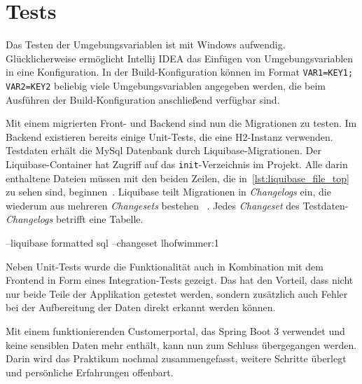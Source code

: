 \section{Tests}

Das Testen der Umgebungsvariablen ist mit Windows aufwendig. Glücklicherweise ermöglicht Intellij IDEA das Einfügen von Umgebungsvariablen in eine Konfiguration. In der Build-Konfiguration können im Format \texttt{VAR1=KEY1; VAR2=KEY2} beliebig viele Umgebungsvariablen angegeben werden, die beim Ausführen der Build-Konfiguration anschließend verfügbar sind.

Mit einem migrierten Front- und Backend sind nun die Migrationen zu testen. Im Backend existieren bereits einige Unit-Tests, die eine H2-Instanz verwenden. Testdaten erhält die MySql Datenbank durch Liquibase-Migrationen. Der Liquibase-Container hat Zugriff auf das \texttt{init}-Verzeichnis im Projekt. Alle darin enthaltene Dateien müssen mit den beiden Zeilen, die in~\autoref{lst:liquibase_file_top} zu sehen sind, beginnen~\parencite{liquibasesqlformat}. Liquibase teilt Migrationen in \textit{Changelogs} ein, die wiederum aus mehreren \textit{Changesets} bestehen ~\parencite{liquibasechangelog}. Jedes \textit{Changeset} des Testdaten-\textit{Changelogs} betrifft eine Tabelle.

\begin{JavaCode}[numbers=none, caption={Die ersten beiden Zeilen jeder \texttt{sql}-Datei im \texttt{init}-Verzeichnis}, label={lst:liquibase_file_top}]
--liquibase formatted sql
--changeset lhofwimmer:1
\end{JavaCode}

Neben Unit-Tests wurde die Funktionalität auch in Kombination mit dem Frontend in Form eines Integration-Tests gezeigt. Das hat den Vorteil, dass nicht nur beide Teile der Applikation getestet werden, sondern zusätzlich auch Fehler bei der Aufbereitung der Daten direkt erkannt werden können.

Mit einem funktionierenden Customerportal, das Spring Boot 3 verwendet und keine sensiblen Daten mehr enthält, kann nun zum Schluss übergegangen werden. Darin wird das Praktikum nochmal zusammengefasst, weitere Schritte überlegt und persönliche Erfahrungen offenbart.